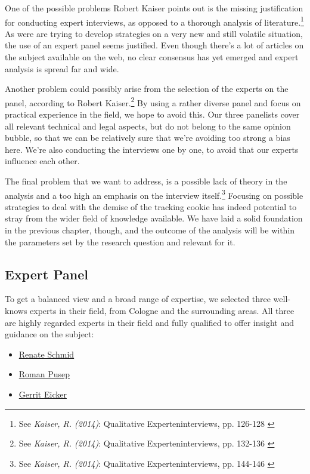 One of the possible problems Robert Kaiser points out is the missing justification for conducting expert interviews, as opposed to a thorough analysis of literature.\footnote{See \textit{Kaiser, R. (2014)}: Qualitative Experteninterviews, pp. 126-128 \cite{expertInterviews}} As were are trying to develop strategies on a very new and still volatile situation, the use of an expert panel seems justified. Even though there's a lot of articles on the subject available on the web, no clear consensus has yet emerged and expert analysis is spread far and wide.

Another problem could possibly arise from the selection of the experts on the panel, according to Robert Kaiser.\footnote{See \textit{Kaiser, R. (2014)}: Qualitative Experteninterviews, pp. 132-136 \cite{expertInterviews}} By using a rather diverse panel and focus on practical experience in the field, we hope to avoid this. Our three panelists cover all relevant technical and legal aspects, but do not belong to the same opinion bubble, so that we can be relatively sure that we're avoiding too strong a bias here. We're also conducting the interviews one by one, to avoid that our experts influence each other.

The final problem that we want to address, is a possible lack of theory in the analysis and a too high an emphasis on the interview itself.\footnote{See \textit{Kaiser, R. (2014)}: Qualitative Experteninterviews, pp. 144-146 \cite{expertInterviews}} Focusing on possible strategies to deal with the demise of the tracking cookie has indeed potential to stray from the wider field of knowledge available. We have laid a solid foundation in the previous chapter, though, and the outcome of the analysis will be within the parameters set by the research question and relevant for it.

\subsection{Expert Panel}

To get a balanced view and a broad range of expertise, we selected three well-knows experts in their field, from Cologne and the surrounding areas. All three are highly regarded experts in their field and fully qualified to offer insight and guidance on the subject:

\begin{itemize}
 \item \href{https://www.linkedin.com/in/renate-schmid-535233113/}{Renate Schmid}
 \item \href{https://www.linkedin.com/in/roman-pusep-36b33374/}{Roman Pusep}
 \item \href{https://www.linkedin.com/in/eicker/}{Gerrit Eicker}
\end{itemize}


